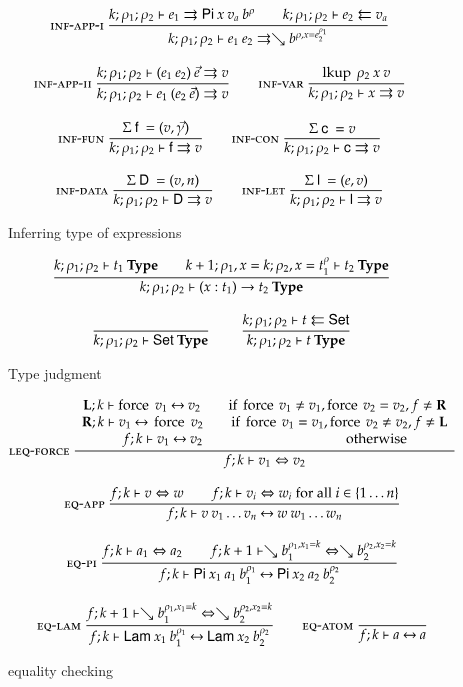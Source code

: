 \begin{figure}
\begin{gather*}
\mbox{\sc inf-app-i}\ \dfrac{k;\rho_1;\rho_2\vdash e_1\rightrightarrows\mathsf{Pi} \: x \: v_a \: b^{\rho}
\qquad k;\rho_1;\rho_2\vdash e_2\leftleftarrows v_a}{k;\rho_1;\rho_2\vdash e_1 \: e_2\rightrightarrows\searrow b^{\rho,x=e_2^{\rho_1}}}
\\[2ex]
\mbox{\sc inf-app-ii}\ \dfrac{k;\rho_1;\rho_2\vdash(e_1 \: e_2)\:\vec{e}\rightrightarrows v}{k;\rho_1;\rho_2\vdash e_1 \: (e_2 \: \vec{e})\rightrightarrows v}
\qquad
\mbox{\sc inf-var}\ \dfrac{\operatorname{lkup} \: \rho_2 \: x \: v}{k;\rho_1;\rho_2\vdash x\rightrightarrows v}
\\[2ex]
\mbox{\sc inf-fun}\ \dfrac{\Sigma \: \mathsf{f} \: = (v,\vec{\gamma}) }{k;\rho_1;\rho_2\vdash\mathsf{f}\rightrightarrows v}
\qquad
\mbox{\sc inf-con}\ \dfrac{\Sigma \: \mathsf{c} \: = v}{k;\rho_1;\rho_2\vdash\mathsf{c}\rightrightarrows v}
\\[2ex] 
\mbox{\sc inf-data}\ \dfrac{\Sigma \: \mathsf{D} \: = (v,n)}{k;\rho_1;\rho_2\vdash\mathsf{D}\rightrightarrows v} 
\qquad
\mbox{\sc inf-let}\ \dfrac{\Sigma \: \mathsf{l} \: = (e,v)}{k;\rho_1;\rho_2\vdash\mathsf{l}\rightrightarrows v}
\end{gather*}
\caption{Inferring type of expressions}
\end{figure}

\begin{figure}
\begin{gather*}
\ \dfrac{k;\rho_1;\rho_2\vdash t_1\:\mathbf{Type}
\qquad
k+1;\rho_1,x=k;\rho_2,x=t_1^{\rho}\vdash t_2\:\mathbf{Type}}{k;\rho_1;\rho_2\vdash( x : t_1 ) \rightarrow{t_2}\:\mathbf{Type}}
\\[2ex]
\ \dfrac{}{k;\rho_1;\rho_2\vdash\mathsf{Set}\:\mathbf{Type}}
\qquad
\ \dfrac{k;\rho_1;\rho_2\vdash t\leftleftarrows\mathsf{Set}}{k;\rho_1;\rho_2\vdash t\:\mathbf{Type}}
\end{gather*}
\caption{Type judgment}
\end{figure}

\begin{figure}
\begin{gather*}
\mbox{\sc leq-force}\ \dfrac{\begin{array}[b]{c}\mathbf{L};k\vdash\operatorname{force} \; v_1{\:\leftrightarrow\:}v_2 \qquad \mbox{if } \operatorname{force} \: v_1 \neq v_1 , \operatorname{force} \: v_2 = v_2  , f \neq \mathbf{R}
\\\mathbf{R};k\vdash v_1{\:\leftrightarrow\:}\operatorname{force} \; v_2 \qquad \mbox{if } \operatorname{force} \: v_1 = v_1 , \operatorname{force} \: v_2 \neq v_2 , f \neq \mathbf{L} \\f;k\vdash v_1{\:\leftrightarrow\:}v_2 \qquad \qquad \qquad \qquad \qquad \mbox{ otherwise}\end{array}}{f;k\vdash v_1\Leftrightarrow v_2}
\\[2ex]
\mbox{\sc eq-app}\ \dfrac{f;k\vdash v\Leftrightarrow w \qquad
f;k\vdash v_i\Leftrightarrow w_i \mbox{ for all } i \in \{ 1 \ldots n\}}{f;k\vdash v \: v_1 \ldots v_n{\:\leftrightarrow\:}w \: w_1 \ldots w_n}
\\[2ex]
\mbox{\sc eq-pi}\ \dfrac{f;k\vdash a_1\Leftrightarrow a_2
\qquad
f;k+1\vdash\searrow b_1^{\rho_1,x_1=k}\Leftrightarrow\searrow b_2^{\rho_2,x_2=k}}{f;k\vdash\mathsf{Pi} \: x_1 \: a_1 \: b_1^{\rho_1}{\:\leftrightarrow\:}\mathsf{Pi} \: x_2 \: a_2 \: b_2^{\rho_2}}
\\[2ex]
\mbox{\sc eq-lam}\ \dfrac{f;k+1\vdash\searrow b_1^{\rho_1,x_1=k}\Leftrightarrow\searrow b_2^{\rho_2,x_2=k}}{f;k\vdash\mathsf{Lam} \: x_1 \: b_1^{\rho_1}{\:\leftrightarrow\:}\mathsf{Lam} \: x_2 \: b_2^{\rho_2}}
\qquad
\mbox{\sc eq-atom}\ \dfrac{}{f;k\vdash a{\:\leftrightarrow\:}a}
\end{gather*}
\caption{equality checking}
\end{figure}

